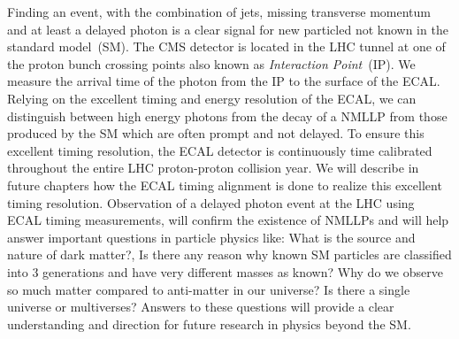 Finding an event, with the combination of jets, missing transverse momentum and at least a delayed photon is a clear signal for new particled not known in the standard model~(SM).
The CMS detector is located in the LHC tunnel at one of the proton bunch crossing points also known as \textit{Interaction Point}~(IP).
We measure the arrival time of the photon from the IP to the surface of the ECAL. Relying on the excellent timing and energy resolution of the ECAL, we can distinguish between high energy photons from the decay of a NMLLP from those produced by the SM which are often prompt and not delayed. To ensure this excellent timing resolution, the ECAL detector is continuously time calibrated throughout the entire LHC proton-proton collision year.%
 We will describe in future chapters how  the ECAL timing alignment is done to realize this excellent timing resolution.
Observation of a delayed photon event at the LHC using ECAL timing measurements, will confirm the existence of NMLLPs and will help answer important questions in particle physics like: What is the source and nature of dark matter?, Is there any reason why known SM particles are classified into 3 generations and have very different masses as known? Why do we observe so much matter compared to anti-matter in our universe? Is there a single universe or multiverses?
Answers to these questions will provide a clear understanding and direction for future research in physics beyond the SM.
